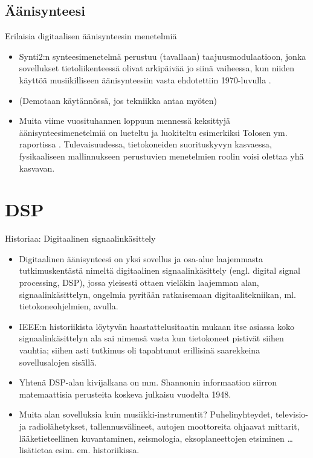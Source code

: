 \documentclass[pdf,handout,10pt]{beamer}
\begin{document}
\subsection{Äänisynteesi}
\begin{frame}{Erilaisia digitaalisen äänisynteesin menetelmiä}
\begin{itemize}
\item
  Synti2:n synteesimenetelmä perustuu (tavallaan) taajuusmodulaatioon,
  jonka sovellukset tietoliikenteessä olivat arkipäivää jo siinä
  vaiheessa, kun niiden käyttöä musiikilliseen äänisynteesiin vasta
  ehdotettiin 1970-luvulla \cite{chowning1973fm}.

\item[]
  (Demotaan käytännössä, jos tekniikka antaa myöten)

\item
  Muita viime vuosituhannen loppuun mennessä keksittyjä
  äänisynteesimenetelmiä on lueteltu ja luokiteltu esimerkiksi Tolosen
  ym. raportissa \cite{TolonenEtal1998evaluation}. Tulevaisuudessa,
  tietokoneiden suorituskyvyn kasvaessa, fysikaaliseen mallinnukseen
  perustuvien menetelmien roolin voisi olettaa yhä kasvavan.

\end{itemize}

\end{frame}

\section{DSP}
\begin{frame}{Historiaa: Digitaalinen signaalinkäsittely}
  \begin{itemize}
    \item
  Digitaalinen äänisynteesi on yksi sovellus ja osa-alue laajemmasta
  tutkimuskentästä nimeltä digitaalinen signaalinkäsittely
  (engl. digital signal processing, DSP), jossa yleisesti ottaen
  vieläkin laajemman alan, signaalinkäsittelyn, ongelmia pyritään
  ratkaisemaan digitaalitekniikan, ml. tietokoneohjelmien,
  avulla.
\item
  IEEE:n historiikista \cite{nebeker1998signalprocessing} löytyvän
  haastattelusitaatin mukaan itse asiassa koko signaalinkäsittelyn ala
  sai nimensä vasta kun tietokoneet pistivät siihen vauhtia; siihen
  asti tutkimus oli tapahtunut erillisinä saarekkeina sovellusalojen
  sisällä.

\item
  Yhtenä DSP-alan kivijalkana on mm. Shannonin informaation siirron
  matemaattisia perusteita koskeva julkaisu
  \cite{shannon48amathematical} vuodelta 1948.

\item
  Muita alan sovelluksia kuin musiikki-instrumentit? Puhelinyhteydet,
  televisio- ja radiolähetykset, tallennusvälineet, autojen
  moottoreita ohjaavat mittarit, lääketieteellinen kuvantaminen,
  seismologia, eksoplaneettojen etsiminen \ldots lisätietoa esim. em.
  historiikissa.
  \end{itemize}
  
\end{frame}
\end{document}
